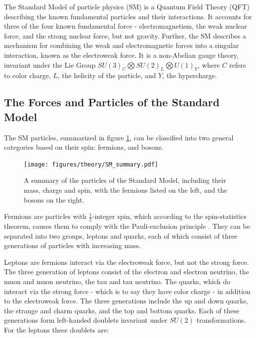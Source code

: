 
The Standard Model of particle physics (SM) is a Quantum Field Theory (QFT) describing the known fundamental particles and their interactions. It accounts for three of the four known fundamental force - electromagnetism, the weak nuclear force, and the strong nuclear force, but not gravity. Further, the SM describes a mechanism for combining the weak and electromagnetic forces into a singular interaction, known as the electroweak force. It is a non-Abelian gauge theory, invariant under the Lie Group $SU(3)_C\bigotimes SU(2)_L\bigotimes U(1)_Y$, where $C$ refers to color charge, $L$, the helicity of the particle, and $Y$, the hypercharge.

\subsection{The Forces and Particles of the Standard Model}
\label{sec:forcesParticles}

The SM particles, summarized in figure \ref{fig:SM_summary}, can be classified into two general categories based on their spin: fermions, and bosons. 

\begin{figure}[!htbp]
\centering
   \texttt{[image: figures/theory/SM\_summary.pdf]}
\caption{A summary of the particles of the Standard Model, including their mass, charge and spin, with the fermions listed on the left, and the bosons on the right. \cite{}}
\label{fig:SM_summary}
\end{figure}

Fermions are particles with $\frac{1}{2}$-integer spin, which according to the spin-statistics theorem, causes them to comply with the Pauli-exclusion principle \cite{}. They can be separated into two groups, leptons and quarks, each of which consist of three generations of particles with increasing mass.

Leptons are fermions interact via the electroweak force, but not the strong force. The three generation of leptons consist of the electron and electron neutrino, the muon and muon neutrino, the tau and tau neutrino. The quarks, which do interact via the strong force - which is to say they have color charge - in addition to the electroweak force. The three generations include the up and down quarks, the strange and charm quarks, and the top and bottom quarks. Each of these generations form left-handed doublets invariant under $SU(2)$ transformations. For the leptons these doublets are:

